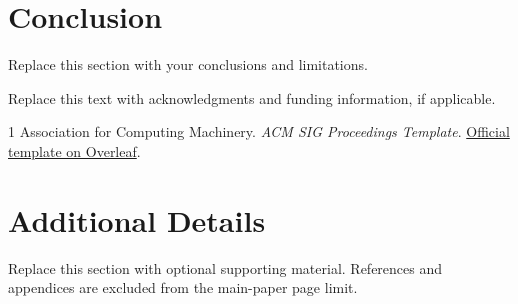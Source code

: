\documentclass[sigconf]{acmart}
\begin{document}
\section{Conclusion}
Replace this section with your conclusions and limitations.

\begin{acks}
Replace this text with acknowledgments and funding information, if applicable.
\end{acks}

% 
% 
\begin{thebibliography}{1}
Association for Computing Machinery.
\newblock \emph{ACM SIG Proceedings Template}.
\newblock \href{https://www.overleaf.com/latex/templates/association-for-computing-machinery-acm-sig-proceedings-template/bmvfhcdnxfty}{Official template on Overleaf}.
\end{thebibliography}

\clearpage
\appendix
\section{Additional Details}
Replace this section with optional supporting material. References and
appendices are excluded from the main-paper page limit.
\end{document}
